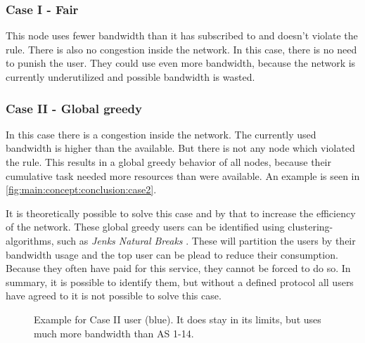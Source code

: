 \documentclass[thesis.tex]{subfiles}
\begin{document}
\subsubsection{Case I - Fair} \label{sub:main:detection:case1}
This node uses fewer bandwidth than it has subscribed to and doesn't violate the rule. There is also no congestion inside the network. In this case, there is no need to punish the user. They could use even more bandwidth, because the network is currently underutilized and possible bandwidth is wasted.

\subsubsection{Case II - Global greedy}
In this case there is a congestion inside the network. The currently used bandwidth is higher than the available. But there is not any node which violated the rule. This results in a global greedy behavior of all nodes, because their cumulative task needed more resources than were available. An example is seen in \autoref{fig:main:concept:conclusion:case2}.

It is theoretically possible to solve this case and by that to increase the efficiency of the network. These global greedy users can be identified using clustering-algorithms, such as \textit{Jenks Natural Breaks} \cite{Frenzel.1967}. These will partition the users by their bandwidth usage and the top user can be plead to reduce their consumption. Because they often have paid for this service, they cannot be forced to do so. In summary, it is possible to identify them, but without a defined protocol all users have agreed to it is not possible to solve this case.

\begin{figure}
	\centering
	\caption{Example for Case II user (blue). It does stay in its limits, but uses much more bandwidth than AS 1-14.}
	\label{fig:main:concept:conclusion:case2}
\end{figure}
\end{document}
